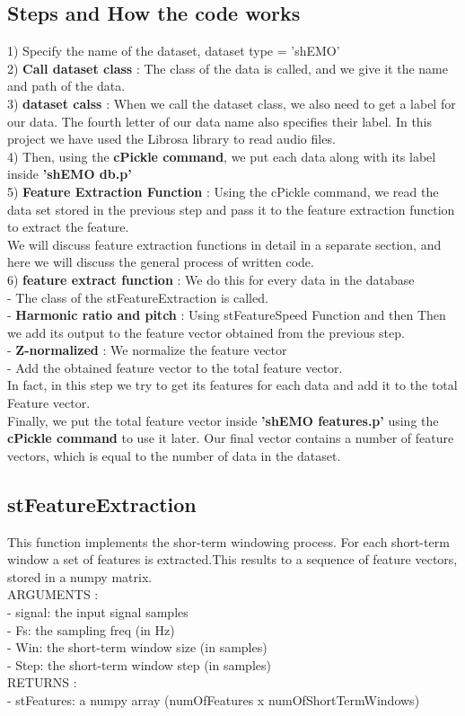\documentclass[10pt]{article}
\begin{document}
\subsection{\textbf{\normalsize Steps and How the code works}}
1) Specify the name of the dataset, dataset type = 'shEMO'\\
2) \textbf{Call dataset class} : The class of the data is called, and we give it the name and path of the data.\\
3) \textbf{dataset calss} : When we call the dataset class, we also need to get a label for our data. The fourth letter of our data name also specifies their label. In this project we have used the Librosa library to read audio files.\\
4) Then, using the \textbf{cPickle command}, we put each data along with its label inside \textbf{'shEMO db.p'}\\
5) \textbf{Feature Extraction Function} : Using the cPickle command, we read the data set stored in the previous step and pass it to the feature extraction function to extract the feature.\\
We will discuss feature extraction functions in detail in a separate section, and here we will discuss the general process of written code.\\
6) \textbf{feature extract function} : We do this for every data in the database\\
- The class of the stFeatureExtraction is called.\\
- \textbf{Harmonic ratio and pitch} : Using stFeatureSpeed Function and then Then we add its output to the feature vector obtained from the previous step.\\
- \textbf{Z-normalized} : We normalize the feature vector\\
- Add the obtained feature vector to the total feature vector. \\
In fact, in this step we try to get its features for each data and add it to the total Feature vector.\\
Finally, we put the total feature vector inside \textbf{'shEMO features.p'} using the \textbf{cPickle command} to use it later. Our final vector contains a number of feature vectors, which is equal to the number of data in the dataset.
\subsection{\textbf{\normalsize stFeatureExtraction }}
This function implements the shor-term windowing process. For each short-term window a set of features is extracted.This results to a sequence of feature vectors, stored in a numpy matrix.\\
ARGUMENTS :\\
- signal:       the input signal samples\\
- Fs:           the sampling freq (in Hz)\\
- Win:          the short-term window size (in samples)\\
- Step:         the short-term window step (in samples)\\
RETURNS :\\
- stFeatures:   a numpy array (numOfFeatures x numOfShortTermWindows)
\end{document}

